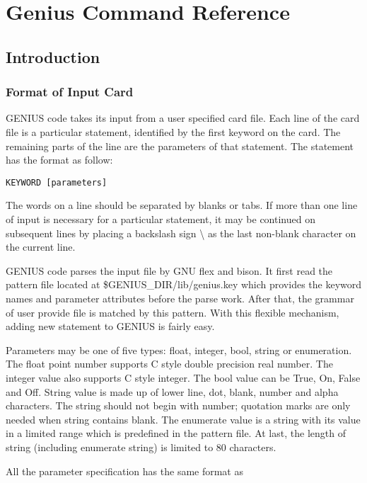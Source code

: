 \chapter{Genius Command Reference}
\section{Introduction}
\subsection{Format of Input Card}
GENIUS code takes its input from a user specified card file. Each line of the card file is a particular
        statement, identified by the first keyword on the card. The remaining parts of the line are the parameters of
        that statement. The statement has the format as follow:
\par
\begin{lstlisting}[basicstyle={\footnotesize\ttfamily},language=IDL]
KEYWORD [parameters]
\end{lstlisting}
The words on a line should be separated by blanks or tabs. If more than one line of input is necessary for
        a particular statement, it may be continued on subsequent lines by placing a backslash sign \textbackslash{} as the last
        non-blank character on the current line.
\par
GENIUS code parses the input file by GNU flex and bison. It first read the
        pattern file located at \$GENIUS\_DIR/lib/genius.key
which provides the keyword names and
        parameter attributes before the parse work. After that, the grammar of user provide file is matched by this
        pattern. With this flexible mechanism, adding new statement to GENIUS is fairly easy.
\par
Parameters may be one of five types: float, integer, bool, string or enumeration. The float point number
        supports C style double precision real number. The integer value also supports C style integer. The bool value
        can be True, On, False and Off. String value is made up of lower line, dot, blank, number and alpha characters.
        The string should not begin with number; quotation marks are only needed when string contains blank. The
        enumerate value is a string with its value in a limited range which is predefined in the pattern file. At last,
        the length of string (including enumerate string) is limited to 80 characters.
\par
All the parameter specification has the same format as
